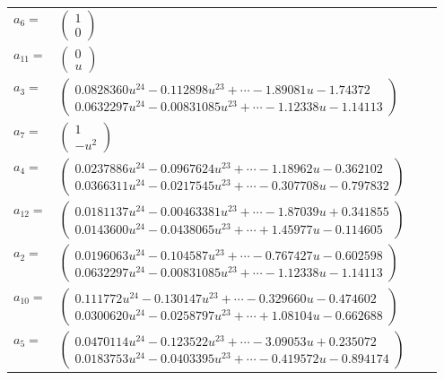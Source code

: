 \documentclass[1p]{elsarticle_modified}
\theoremstyle{definition}
\begin{document}
\begin{tabular}{m{7pt} m{180pt} m{7pt} m{180pt} }
\flushright $a_{6}=$&$\begin{pmatrix}1\\0\end{pmatrix}$ \\
\flushright $a_{11}=$&$\begin{pmatrix}0\\u\end{pmatrix}$ \\
\flushright $a_{3}=$&$\begin{pmatrix}0.0828360 u^{24}-0.112898 u^{23}+\cdots-1.89081 u-1.74372\\0.0632297 u^{24}-0.00831085 u^{23}+\cdots-1.12338 u-1.14113\end{pmatrix}$ \\
\flushright $a_{7}=$&$\begin{pmatrix}1\\- u^2\end{pmatrix}$ \\
\flushright $a_{4}=$&$\begin{pmatrix}0.0237886 u^{24}-0.0967624 u^{23}+\cdots-1.18962 u-0.362102\\0.0366311 u^{24}-0.0217545 u^{23}+\cdots-0.307708 u-0.797832\end{pmatrix}$ \\
\flushright $a_{12}=$&$\begin{pmatrix}0.0181137 u^{24}-0.00463381 u^{23}+\cdots-1.87039 u+0.341855\\0.0143600 u^{24}-0.0438065 u^{23}+\cdots+1.45977 u-0.114605\end{pmatrix}$ \\
\flushright $a_{2}=$&$\begin{pmatrix}0.0196063 u^{24}-0.104587 u^{23}+\cdots-0.767427 u-0.602598\\0.0632297 u^{24}-0.00831085 u^{23}+\cdots-1.12338 u-1.14113\end{pmatrix}$ \\
\flushright $a_{10}=$&$\begin{pmatrix}0.111772 u^{24}-0.130147 u^{23}+\cdots-0.329660 u-0.474602\\0.0300620 u^{24}-0.0258797 u^{23}+\cdots+1.08104 u-0.662688\end{pmatrix}$ \\
\flushright $a_{5}=$&$\begin{pmatrix}0.0470114 u^{24}-0.123522 u^{23}+\cdots-3.09053 u+0.235072\\0.0183753 u^{24}-0.0403395 u^{23}+\cdots-0.419572 u-0.894174\end{pmatrix}$ \\

\end{tabular}
\end{document}
